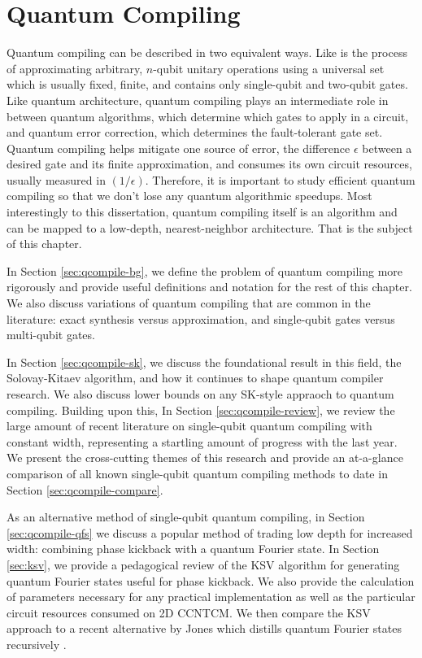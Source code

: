 \chapter{Quantum Compiling}
\label{chap:qcompile}

Quantum compiling can be described in two equivalent ways.
Like 
is the process of approximating arbitrary,
$n$-qubit unitary operations using a universal set which
is usually fixed, finite, and contains only single-qubit
and two-qubit gates. Like quantum architecture, quantum
compiling plays an intermediate role in between quantum
algorithms, which determine which gates to apply in a circuit,
and quantum error correction, which determines the
fault-tolerant gate set.
Quantum compiling helps mitigate one source of error,
the difference $\epsilon$ between a desired gate and its
finite approximation,
and consumes its own circuit resources, usually measured in
$(1 / \epsilon)$.
Therefore, it is important to study efficient quantum 
compiling so that we don't lose any quantum algorithmic speedups.
Most interestingly to this dissertation, quantum compiling itself
is an algorithm and can be mapped to a low-depth, nearest-neighbor
architecture. That is the subject of this chapter.

In Section \ref{sec:qcompile-bg}, we define the problem of
quantum compiling more rigorously and provide useful definitions
and notation for the rest of this chapter. We also discuss
variations of quantum compiling that are common in the
literature: exact synthesis versus approximation, and
single-qubit gates versus multi-qubit gates.

In Section \ref{sec:qcompile-sk}, we discuss the foundational
result in this field, the Solovay-Kitaev algorithm, and how it
continues to shape quantum compiler research. We also discuss
lower bounds on any SK-style appraoch to quantum compiling.
Building upon this,
In Section \ref{sec:qcompile-review}, we review the large
amount of recent literature on single-qubit quantum compiling with
constant width, representing
a startling amount of progress with the last year. We present
the cross-cutting themes of this research and provide an
at-a-glance comparison of all known single-qubit quantum compiling methods
to date in Section \ref{sec:qcompile-compare}.

As an alternative method of single-qubit quantum compiling,
in Section \ref{sec:qcompile-qfs} we
discuss a popular method of trading low depth for increased
width: combining phase kickback with a quantum Fourier state.
In Section \ref{sec:ksv}, we provide a pedagogical review
of the KSV algorithm for generating quantum Fourier states
useful for phase kickback. We also provide the calculation of
parameters necessary for any practical implementation as well as
the particular circuit resources consumed on \textsf{2D CCNTCM}.
We then compare the KSV approach to a recent alternative
by Jones which distills quantum Fourier states recursively \cite{Jones2013}.

